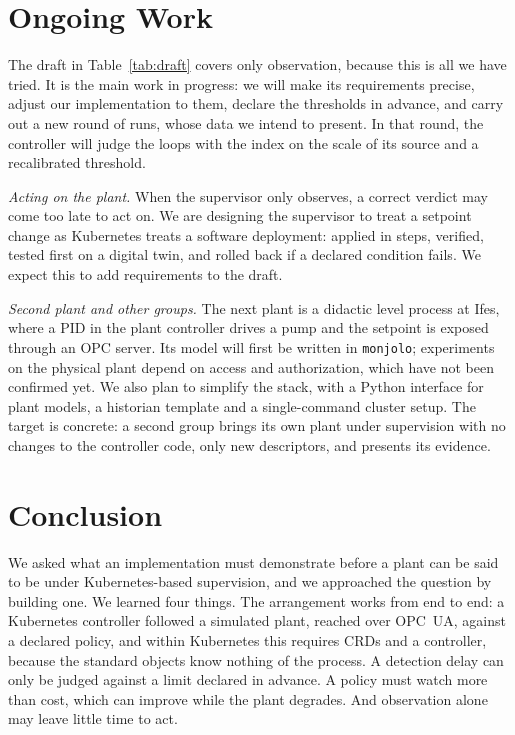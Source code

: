 \documentclass[conference]{IEEEtran}
\begin{document}
\section{Ongoing Work}

The draft in Table~\ref{tab:draft} covers only observation, because this is all we have tried. It is the main work in progress: we will make its requirements precise, adjust our implementation to them, declare the thresholds in advance, and carry out a new round of runs, whose data we intend to present. In that round, the controller will judge the loops with the index on the scale of its source and a recalibrated threshold.

\textit{Acting on the plant.} When the supervisor only observes, a correct verdict may come too late to act on. We are designing the supervisor to treat a setpoint change as Kubernetes treats a software deployment: applied in steps, verified, tested first on a digital twin, and rolled back if a declared condition fails. We expect this to add requirements to the draft.

\textit{Second plant and other groups.} The next plant is a didactic level process at Ifes, where a PID in the plant controller drives a pump and the setpoint is exposed through an OPC server. Its model will first be written in \texttt{monjolo}; experiments on the physical plant depend on access and authorization, which have not been confirmed yet. We also plan to simplify the stack, with a Python interface for plant models, a historian template and a single-command cluster setup. The target is concrete: a second group brings its own plant under supervision with no changes to the controller code, only new descriptors, and presents its evidence.

\section{Conclusion}

We asked what an implementation must demonstrate before a plant can be said to be under Kubernetes-based supervision, and we approached the question by building one. We learned four things. The arrangement works from end to end: a Kubernetes controller followed a simulated plant, reached over OPC~UA, against a declared policy, and within Kubernetes this requires CRDs and a controller, because the standard objects know nothing of the process. A detection delay can only be judged against a limit declared in advance. A policy must watch more than cost, which can improve while the plant degrades. And observation alone may leave little time to act.
\end{document}
